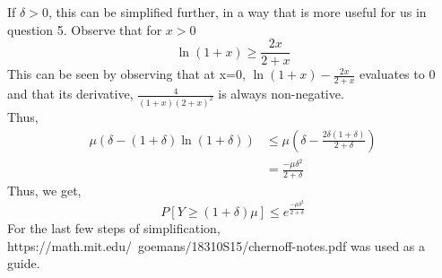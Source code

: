 \begin{enumerate}
    If $\delta > 0$, this can be simplified further, in a way that is more useful for us in question 5. Observe that for $x > 0$
    \[
        \ln(1+x) \ge \frac{2x}{2+x}
    \]
    This can be seen by observing that at x=0, $\ln(1+x)-\frac{2x}{2+x}$ evaluates to 0 and that its derivative, $\frac{4}{(1+x)(2+x)^2}$ is always non-negative.\\
    Thus, 
    \begin{align*}
        \mu (\delta - (1+\delta)\ln(1+\delta)) &\le \mu (\delta - \frac{2\delta(1+\delta)}{2+\delta})\\
        &= \frac{-\mu\delta^2}{2+\delta}
    \end{align*}
    Thus, we get,
    \begin{equation}
        \label{eq:2}
        P[Y\ge (1+\delta)\mu] \le e^{\frac{-\mu\delta^2}{2+\delta}}
    \end{equation}
    For the last few steps of simplification, https://math.mit.edu/~goemans/18310S15/chernoff-notes.pdf was used as a guide.
\end{enumerate}
